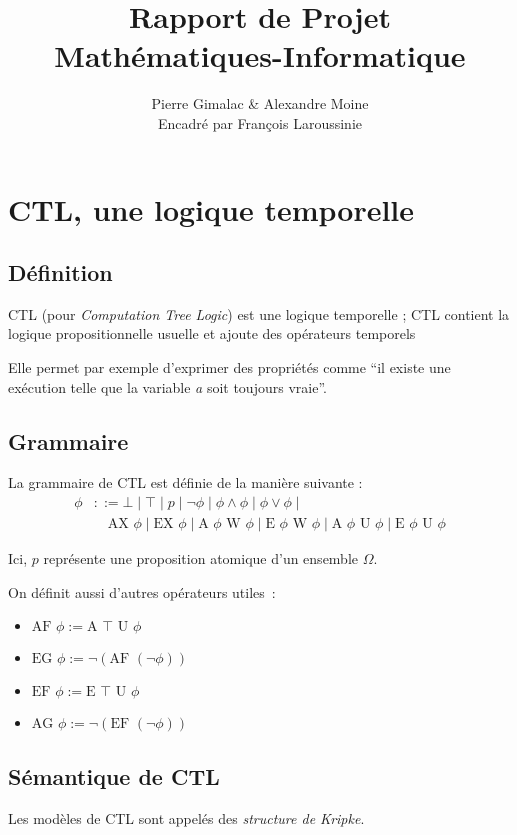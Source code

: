 \documentclass[10pt,a4paper]{article}
\author{Pierre Gimalac \& Alexandre Moine\\\small{Encadré par François Laroussinie}}
\title{Rapport de Projet\\Mathématiques-Informatique}
\begin{document}
\maketitle

\section{CTL, une logique temporelle}
\subsection{Définition}
CTL (pour \textit{Computation Tree Logic}) est une logique temporelle ; CTL contient la logique propositionnelle usuelle et ajoute des opérateurs temporels

Elle permet par exemple d'exprimer des propriétés comme ``il existe une exécution telle que la variable \textit{a} soit toujours vraie''.

\subsection{Grammaire}
La grammaire de CTL est définie de la manière suivante :
\begin{align*}
\phi &::= \bot \mid \top \mid p \mid \neg \phi \mid \phi\land\phi \mid \phi\lor\phi \mid \\
&\quad \mbox{AX }\phi \mid \mbox{EX }\phi \mid
\mbox{A }\phi \mbox{ W } \phi \mid \mbox{E }\phi \mbox{ W } \phi \mid
\mbox{A }\phi \mbox{ U } \phi \mid \mbox{E }\phi \mbox{ U } \phi
\end{align*}

Ici, $p$ représente une proposition atomique d'un ensemble $\Omega$.

On définit aussi d'autres opérateurs utiles :
\begin{itemize}
	\item $\mbox{AF } \phi := \mbox{A } \top \mbox{ U } \phi$
	\item $\mbox{EG } \phi := \neg (\mbox{AF } (\neg \phi))$
	\item $\mbox{EF } \phi := \mbox{E } \top \mbox{ U } \phi$
	\item $\mbox{AG } \phi := \neg (\mbox{EF } (\neg \phi))$
\end{itemize}

\subsection{Sémantique de CTL}
Les modèles de CTL sont appelés des \emph{structure de Kripke}.
\end{document}
